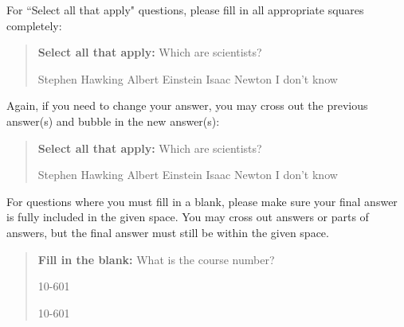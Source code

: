 \documentclass[11pt,addpoints,answers]{exam}
\begin{document}
For ``Select all that apply" questions, please fill in all appropriate squares completely:

\begin{quote}
\textbf{Select all that apply:} Which are scientists?
    {%
    \checkboxchar{$\Box$} \checkedchar{$\blacksquare$} %
    \begin{checkboxes}
    \CorrectChoice Stephen Hawking 
    \CorrectChoice Albert Einstein
    \CorrectChoice Isaac Newton
    \choice I don't know
    \end{checkboxes}
    }
\end{quote}

Again, if you need to change your answer, you may cross out the previous answer(s) and bubble in the new answer(s):

\begin{quote}
\textbf{Select all that apply:} Which are scientists?
    {%
    \checkboxchar{\xcancel{$\blacksquare$}} \checkedchar{$\blacksquare$} %
    \begin{checkboxes}
    \CorrectChoice Stephen Hawking 
    \CorrectChoice Albert Einstein
    \CorrectChoice Isaac Newton
    \choice I don't know
    \end{checkboxes}
    }
\end{quote}

For questions where you must fill in a blank, please make sure your final answer is fully included in the given space. You may cross out answers or parts of answers, but the final answer must still be within the given space.

\begin{quote}
\textbf{Fill in the blank:} What is the course number?

\begin{tcolorbox}[fit,height=1cm, width=4cm, blank, borderline={1pt}{-2pt},nobeforeafter]
    \begin{center}\huge10-601\end{center}
    \end{tcolorbox}\hspace{2cm}
    \begin{tcolorbox}[fit,height=1cm, width=4cm, blank, borderline={1pt}{-2pt},nobeforeafter]
    \begin{center}\huge10-601\end{center}
    \end{tcolorbox}
\end{quote}
\end{document}
